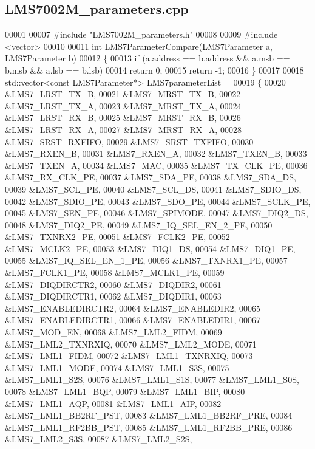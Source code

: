 \subsection{L\+M\+S7002\+M\+\_\+parameters.\+cpp}
\label{LMS7002M__parameters_8cpp_source}

\begin{DoxyCode}
00001 
00007 \textcolor{preprocessor}{#include "LMS7002M_parameters.h"}
00008 
00009 \textcolor{preprocessor}{#include <vector>}
00010 
00011 \textcolor{keywordtype}{int} LMS7ParameterCompare(LMS7Parameter a, LMS7Parameter b)
00012 \{
00013     \textcolor{keywordflow}{if} (a.address == b.address && a.msb == b.msb && a.lsb == b.lsb)
00014         \textcolor{keywordflow}{return} 0;
00015     \textcolor{keywordflow}{return} -1;
00016 \}
00017 
00018 std::vector<const LMS7Parameter*> LMS7parameterList =
00019 \{
00020 &LMS7_LRST_TX_B,
00021 &LMS7_MRST_TX_B,
00022 &LMS7_LRST_TX_A,
00023 &LMS7_MRST_TX_A,
00024 &LMS7_LRST_RX_B,
00025 &LMS7_MRST_RX_B,
00026 &LMS7_LRST_RX_A,
00027 &LMS7_MRST_RX_A,
00028 &LMS7_SRST_RXFIFO,
00029 &LMS7_SRST_TXFIFO,
00030 &LMS7_RXEN_B,
00031 &LMS7_RXEN_A,
00032 &LMS7_TXEN_B,
00033 &LMS7_TXEN_A,
00034 &LMS7_MAC,
00035 &LMS7_TX_CLK_PE,
00036 &LMS7_RX_CLK_PE,
00037 &LMS7_SDA_PE,
00038 &LMS7_SDA_DS,
00039 &LMS7_SCL_PE,
00040 &LMS7_SCL_DS,
00041 &LMS7_SDIO_DS,
00042 &LMS7_SDIO_PE,
00043 &LMS7_SDO_PE,
00044 &LMS7_SCLK_PE,
00045 &LMS7_SEN_PE,
00046 &LMS7_SPIMODE,
00047 &LMS7_DIQ2_DS,
00048 &LMS7_DIQ2_PE,
00049 &LMS7_IQ_SEL_EN_2_PE,
00050 &LMS7_TXNRX2_PE,
00051 &LMS7_FCLK2_PE,
00052 &LMS7_MCLK2_PE,
00053 &LMS7_DIQ1_DS,
00054 &LMS7_DIQ1_PE,
00055 &LMS7_IQ_SEL_EN_1_PE,
00056 &LMS7_TXNRX1_PE,
00057 &LMS7_FCLK1_PE,
00058 &LMS7_MCLK1_PE,
00059 &LMS7_DIQDIRCTR2,
00060 &LMS7_DIQDIR2,
00061 &LMS7_DIQDIRCTR1,
00062 &LMS7_DIQDIR1,
00063 &LMS7_ENABLEDIRCTR2,
00064 &LMS7_ENABLEDIR2,
00065 &LMS7_ENABLEDIRCTR1,
00066 &LMS7_ENABLEDIR1,
00067 &LMS7_MOD_EN,
00068 &LMS7_LML2_FIDM,
00069 &LMS7_LML2_TXNRXIQ,
00070 &LMS7_LML2_MODE,
00071 &LMS7_LML1_FIDM,
00072 &LMS7_LML1_TXNRXIQ,
00073 &LMS7_LML1_MODE,
00074 &LMS7_LML1_S3S,
00075 &LMS7_LML1_S2S,
00076 &LMS7_LML1_S1S,
00077 &LMS7_LML1_S0S,
00078 &LMS7_LML1_BQP,
00079 &LMS7_LML1_BIP,
00080 &LMS7_LML1_AQP,
00081 &LMS7_LML1_AIP,
00082 &LMS7_LML1_BB2RF_PST,
00083 &LMS7_LML1_BB2RF_PRE,
00084 &LMS7_LML1_RF2BB_PST,
00085 &LMS7_LML1_RF2BB_PRE,
00086 &LMS7_LML2_S3S,
00087 &LMS7_LML2_S2S,

\end{DoxyCode}
